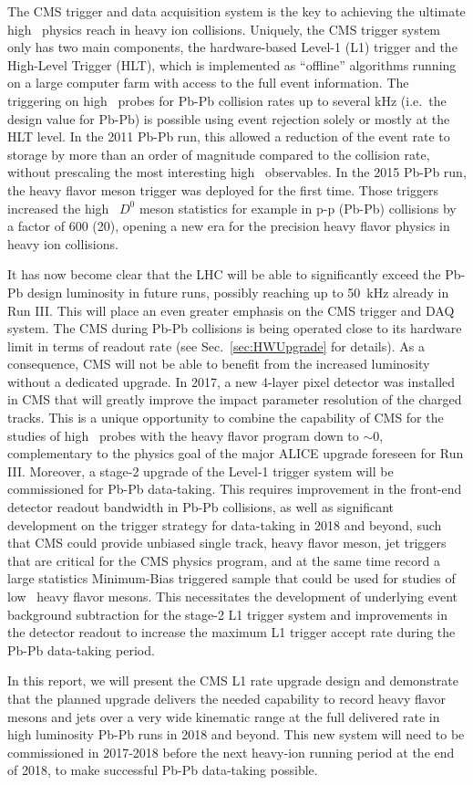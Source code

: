 The CMS trigger and data acquisition system is the key to achieving the ultimate high \pt\ physics reach in heavy ion
collisions. Uniquely, the CMS trigger system only has two main components, the hardware-based Level-1 (L1) trigger and
the High-Level Trigger (HLT), which is implemented as ``offline'' algorithms running on a large computer farm with
access to the full event information. The triggering on high \pt\ probes for Pb-Pb collision rates up to several kHz (i.e.\ the design value for Pb-Pb) is possible using event rejection
solely or mostly at the HLT level. In the 2011 Pb-Pb run, this allowed a reduction of the event rate to storage by more
than an order of magnitude compared to the collision rate, without prescaling the most interesting high \pt\
observables. In the 2015 Pb-Pb run, the heavy flavor meson trigger was deployed for the first time. Those triggers increased the high \pt\ $D^0$ meson statistics for example in
p-p (Pb-Pb) collisions by a factor of 600 (20), opening a new era for the precision heavy flavor physics in heavy ion
collisions.

It has now become clear that the LHC will be able to significantly exceed the Pb-Pb design luminosity in future runs,
possibly reaching up to 50~kHz already in Run III. This will place an even greater emphasis on the CMS trigger and DAQ
system. The CMS during Pb-Pb collisions is being operated close to its hardware limit in terms of readout rate (see
Sec.~\ref{sec:HWUpgrade} for details). As a consequence, CMS will not be able to benefit from the increased luminosity
without a dedicated upgrade. In 2017, a new 4-layer pixel detector was installed in CMS that will greatly improve
the impact parameter resolution of the charged tracks. This is a unique opportunity to combine the capability of CMS for
the studies of high \pt\ probes with the heavy flavor program down to \pt$\sim 0$, complementary to the physics goal of
the major ALICE upgrade foreseen for Run III. Moreover, a stage-2 upgrade of the Level-1 trigger system will be
commissioned for Pb-Pb data-taking. This requires improvement in the front-end detector readout bandwidth in Pb-Pb
collisions, as well as significant development on the trigger strategy for data-taking in 2018 and beyond, such that CMS
could provide unbiased single track, heavy flavor meson, jet triggers that are critical for the CMS physics program, and
at the same time record a large statistics Minimum-Bias triggered sample that could be used for studies of low \pt\
heavy flavor mesons. This necessitates the development of underlying event background subtraction for the stage-2 L1
trigger system and improvements in the detector readout to increase the maximum L1 trigger accept rate during the Pb-Pb
data-taking period.

In this report, we will present the CMS L1 rate upgrade design and demonstrate that the planned upgrade delivers the
needed capability to record heavy flavor mesons and jets over a very wide kinematic range at the full delivered rate in
high luminosity Pb-Pb runs in 2018 and beyond. This new system will need to be commissioned in 2017-2018 before the next
heavy-ion running period at the end of 2018, to make successful Pb-Pb data-taking possible.

